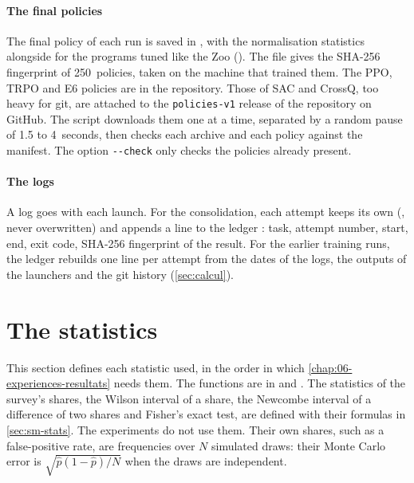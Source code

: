 \paragraph{The final policies}
The final policy of each run is saved in
\allowbreak{}\allowbreak{}\allowbreak{}, with the
normalisation statistics alongside for the programs tuned like the Zoo (). The file
 gives the SHA-256 fingerprint of 250~policies, taken on
the machine that trained them. The PPO, TRPO and E6 policies are in the repository. Those of SAC and CrossQ,
too heavy for git, are attached to the \texttt{policies-v1} release of the repository on GitHub. The script
 downloads them one at a time, separated by a random pause of 1.5 to 4~seconds, then
checks each archive and each policy against the manifest. The option \texttt{-{}-check} only checks the
policies already present.

\paragraph{The logs}
A log goes with each launch. For the consolidation, each attempt keeps its own
(, never overwritten) and appends a line to the ledger
: task, attempt number, start, end, exit code, SHA-256 fingerprint of the result. For
the earlier training runs, the ledger  rebuilds one line per attempt from the
dates of the logs, the outputs of the launchers and the git history (\cref{sec:calcul}).

\section{The statistics}\label{sec:statistiques}

This section defines each statistic used, in the order in which \cref{chap:06-experiences-resultats} needs
them. The functions are in  and \allowbreak{}.
The statistics of the survey's shares, the Wilson interval of a share, the Newcombe interval of a difference of
two shares and Fisher's exact test, are defined with their formulas in \cref{sec:sm-stats}. The experiments do
not use them. Their own shares, such as a false-positive rate, are frequencies over $N$ simulated draws: their
Monte Carlo error is $\sqrt{\hat p(1-\hat p)/N}$ when the draws are independent.

